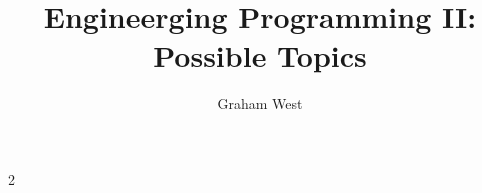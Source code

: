 \documentclass{article}
\begin{document}
\title{Engineerging Programming II: \\ Possible Topics}
\author{Graham West}
\date{}

\maketitle

\large


\begin{multicols}{2}




\end{multicols}
\end{document}
